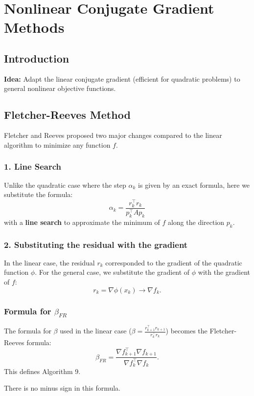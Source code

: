 \chapter{Nonlinear Conjugate Gradient Methods}

\section{Introduction}

\textbf{Idea:} Adapt the linear conjugate gradient (efficient for quadratic problems) to general nonlinear objective functions.

\section{Fletcher-Reeves Method}

Fletcher and Reeves \cite{fletcher1964function} proposed two major changes compared to the linear algorithm to minimize any function $f$.

\subsection{1. Line Search}
Unlike the quadratic case where the step $\alpha_k$ is given by an exact formula, here we substitute the formula:
\[
\alpha_k = \frac{r_k^\top r_k}{p_k^\top A p_k}
\]
with a \textbf{line search} to approximate the minimum of $f$ along the direction $p_k$.

\subsection{2. Substituting the residual with the gradient}
In the linear case, the residual $r_k$ corresponded to the gradient of the quadratic function $\phi$. For the general case, we substitute the gradient of $\phi$ with the gradient of $f$:
\[
r_k = \nabla \phi(x_k) \longrightarrow \nabla f_k.
\]

\subsection{Formula for \texorpdfstring{$\beta_{FR}$}{beta\_FR}}
The formula for $\beta$ used in the linear case ($\beta = \frac{r_{k+1}^\top r_{k+1}}{r_k^\top r_k}$) becomes the Fletcher-Reeves formula:
\[
\boxed{\beta_{FR} = \frac{\nabla f_{k+1}^\top \nabla f_{k+1}}{\nabla f_k^\top \nabla f_k}}.
\]
This defines Algorithm 9.

\begin{remarque}
There is no minus sign in this formula.
\end{remarque}

